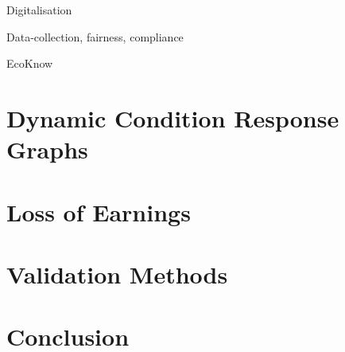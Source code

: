 \documentclass[envcountsame]{llncs}
\begin{document}
Digitalisation

Data-collection, fairness, compliance

EcoKnow

\section{Dynamic Condition Response Graphs}

\section{Loss of Earnings}

\section{Validation Methods}

\section{Conclusion}

%
%


\end{document}
